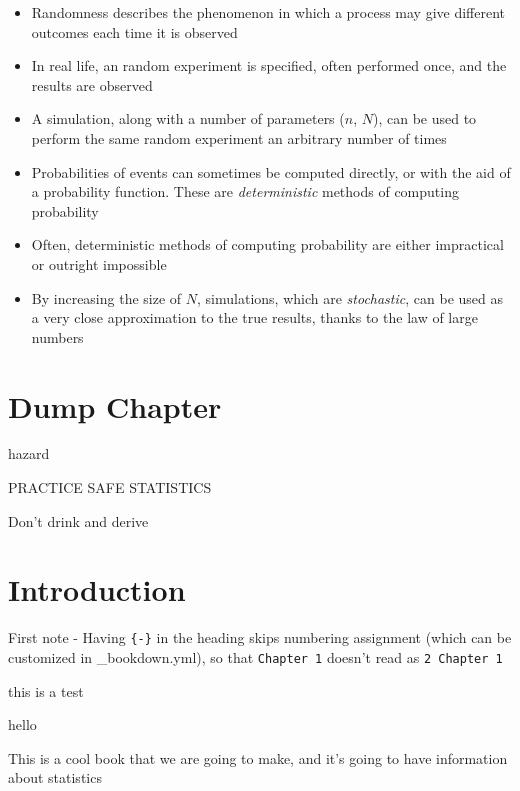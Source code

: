 \documentclass[
]{book}
\providecommand{\tightlist}{%
  \setlength{\itemsep}{0pt}\setlength{\parskip}{0pt}}
\theoremstyle{definition}
\theoremstyle{definition}
\theoremstyle{definition}
\theoremstyle{remark}
\begin{document}
\begin{itemize}
\tightlist
\item
  Randomness describes the phenomenon in which a process may give different outcomes each time it is observed
\item
  In real life, an random experiment is specified, often performed once, and the results are observed
\item
  A simulation, along with a number of parameters (\(n\), \(N\)), can be used to perform the same random experiment an arbitrary number of times
\item
  Probabilities of events can sometimes be computed directly, or with the aid of a probability function. These are \emph{deterministic} methods of computing probability
\item
  Often, deterministic methods of computing probability are either impractical or outright impossible
\item
  By increasing the size of \(N\), simulations, which are \emph{stochastic}, can be used as a very close approximation to the true results, thanks to the law of large numbers
\end{itemize}

\hypertarget{ch14}{%
\chapter{Dump Chapter}\label{ch14}}

\begin{infobox}hazard

PRACTICE SAFE STATISTICS

Don't drink and derive

\end{infobox}

\hypertarget{introduction-1}{%
\chapter*{Introduction}\label{introduction-1}}

First note - Having \texttt{\{-\}} in the heading skips numbering assignment (which can be customized in \_bookdown.yml), so that \texttt{Chapter\ 1} doesn't read as \texttt{2\ Chapter\ 1}

this is a test

hello

This is a cool book that we are going to make, and it's going to have information about statistics
\end{document}

